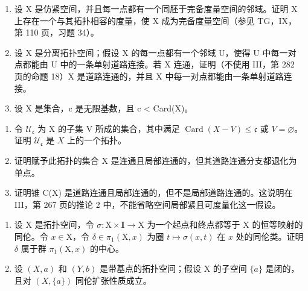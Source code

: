 \begin{enumerate}
\def\labelenumi{\arabic{enumi})}
\setcounter{enumi}{11}
\item
  设 X 是仿紧空间，并且每一点都有一个同胚于完备度量空间的邻域。证明 X 上存在一个与其拓扑相容的度量，使 X 成为完备度量空间（参见 TG，IX，第 110 页，习题 34）。
\item
  设 X 是分离拓扑空间；假设 X 的每一点都有一个邻域 U，使得 U 中每一对点都能由 U 中的一条单射道路连接。若 X 连通，证明（不使用 III，第 282 页的命题 18）X 是道路连通的，并且 X 中每一对点都能由一条单射道路连接。
\item
  设 X 是集合，c 是无限基数，且 c \textless{} Card(X)。
\end{enumerate}

\begin{enumerate}
\def\labelenumi{\alph{enumi})}
\item
  令 \(\mathcal{U}_{\mathfrak{c}}\) 为 X 的子集 V 所成的集合，其中满足 \(\operatorname{Card}(X - V) \leqslant \mathfrak{c}\) 或 \(V = \varnothing\)。证明 \(\mathcal{U}_{\mathfrak{c}}\) 是 \(X\) 上的一个拓扑。
\item
  证明赋予此拓扑的集合 X 是连通且局部连通的，但其道路连通分支都退化为单点。
\item
  证明锥 C(X) 是道路连通且局部连通的，但不是局部道路连通的。这说明在 III，第 267 页的推论 2 中，不能省略空间局部紧且可度量化这一假设。
\end{enumerate}

\exercisegroup

\begin{enumerate}
\def\labelenumi{\arabic{enumi})}
\item
  设 X 是拓扑空间，令 \(\sigma: \mathrm{X} \times \mathbf{I} \to \mathrm{X}\) 为一个起点和终点都等于 X 的恒等映射的同伦。令 \(x \in \mathrm{X}\)，令 \(\delta \in \pi_1(\mathrm{X}, x)\) 为圈 \(t \mapsto \sigma(x, t)\) 在 \(x\) 处的同伦类。证明 \(\delta\) 属于群 \(\pi_1(\mathrm{X}, x)\) 的中心。
\item
  设 \((X, a)\) 和 \((Y, b)\) 是带基点的拓扑空间；假设 X 的子空间 \(\{a\}\) 是闭的，且对 \((X, \{a\})\) 同伦扩张性质成立。
\end{enumerate}


